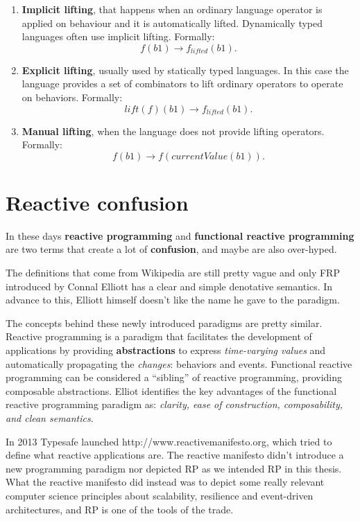 \begin{enumerate}
\def\labelenumi{\arabic{enumi}.}
\item
  \textbf{Implicit lifting}, that happens when an ordinary language
  operator is applied on behaviour and it is automatically lifted.
  Dynamically typed languages often use implicit lifting.
  Formally: \[
  f(b1)  \rightarrow f_{lifted}(b1) .
  \]
\item
  \textbf{Explicit lifting}, usually used by statically typed languages.
  In this case the language provides a set of combinators to lift
  ordinary operators to operate on behaviors. Formally: \[
  lift(f)(b1)  \rightarrow f_{lifted}(b1) .
  \]
\item
  \textbf{Manual lifting}, when the language does not provide lifting
  operators. Formally: \[
  f(b1)  \rightarrow f(currentValue(b1)) .
  \]
\end{enumerate}


\section{Reactive confusion}\label{reactive-confusion}

In these days \textbf{reactive programming} and \textbf{functional
reactive programming} are two terms that create a lot of
\textbf{confusion}, and maybe are also over-hyped.

The definitions that come from Wikipedia are still pretty vague and only
FRP introduced by Connal Elliott has a clear
and simple denotative semantics. In advance to this, Elliott himself
doesn't like the name he gave to the paradigm.

The concepts behind these newly introduced paradigms are pretty similar.
Reactive programming is a paradigm that facilitates the development of
applications by providing \textbf{abstractions} to express
\emph{time-varying values} and automatically propagating the
\emph{changes}: behaviors and events. Functional reactive programming
can be considered a ``sibling'' of reactive programming, providing
composable abstractions. Elliot identifies the key advantages of the
functional reactive programming paradigm as: \emph{clarity, ease of
construction, composability, and clean semantics}.

In 2013 Typesafe launched http://www.reactivemanifesto.org, which tried
to define what reactive applications are. The reactive manifesto didn't
introduce a new programming paradigm nor depicted RP as we intended RP
in this thesis. What the reactive manifesto did instead was to depict
some really relevant computer science principles about scalability,
resilience and event-driven architectures, and RP is one of the tools of
the trade.

